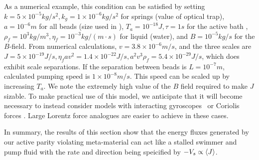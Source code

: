 \documentclass[
 preprint,
 preprintnumbers,
 amsmath,amssymb,
 aps,
 pre,
 longbibliography,
 superscriptaddress,
 10pt, twocolumn
]{revtex4-1}
\begin{document}
As a numerical example, this condition can be satisfied by setting $k=5\times 10^{-5} kg/s^2, k_g=1\times 10^{-6} kg/s^2$ for springs (value of optical trap), $a=10^{-6}m$ for all beads (size used in \cite{Leoni2009BasicSwimmer}), $T_a=10^{-18} J, \tau=1s$ for the active bath \cite{Wu2000ParticleDiffusion}, $\rho_f=10^3kg/m^3, \eta_f=10^{-3}kg/(m\cdot s)$ for liquid (water), and $B=10^{-5} kg/s$ for the $B$-field.
From numerical calculations, $v=3.8\times 10^{-6}m/s$, and the three scales are $J=5\times 10^{-19}J/s, \eta_f av^2=1.4\times 10^{-22}J/s, a^2v^3\rho_f=5.4\times 10^{-29}J/s$, which does exhibit scale separations.
If the separation between beads is $L=10^{-7}m$, calculated pumping speed is $1\times 10^{-8} m/s$.
This speed can be scaled up by increasing $T_a$.
We note the extremely high value of the $B$ field required to make $J$ sizable. To make practical use of this model, we anticipate that it will become necessary to instead consider models with interacting gyroscopes~\cite{Nash2015TopologicalMechanics} or Coriolis forces \cite{Kahlert2012MagnetizingComplex}. Large Lorentz force analogues are easier to achieve in these cases. 

In summary, the results of this section show that the energy fluxes generated by our active parity violating meta-material can act like a stalled swimmer and pump fluid with the rate and direction being speicified by $-V_s \propto \expval{J}$. 


\end{document}
